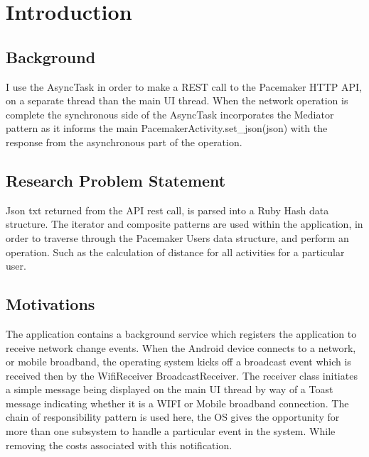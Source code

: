 \documentclass[runningheads,a4paper]{llncs}
\begin{document}
%
%
\section{Introduction}
\subsection{Background}
I use the AsyncTask in order to make a REST call \cite[p.~215]{Xarticle} to the Pacemaker HTTP API, on a separate thread than the main UI thread. When the network operation is complete the synchronous side of the AsyncTask incorporates the Mediator pattern as it informs the main PacemakerActivity.set\_json(json) with the response from the asynchronous part of the operation. \citep*{goossens93}
%
\newpage
%
\subsection{Research Problem Statement}
Json txt returned from the API rest call, is parsed into a Ruby Hash data structure. The iterator and composite patterns are used within the application, in order to traverse through the Pacemaker Users data structure, and perform an operation. Such as the calculation of distance for all activities for a particular user.
%
\newpage
%
\subsection{Motivations}
The application contains a background service which registers the application to receive network change events. When the Android device connects to a network, or mobile broadband, the operating system kicks off a broadcast event which is received then by the WifiReceiver BroadcastReceiver. The receiver class initiates a simple message being displayed on the main UI thread by way of a Toast message indicating whether it is a WIFI or Mobile broadband connection. The chain of responsibility pattern is used here, the OS gives the opportunity for more than one subsystem to handle a particular event in the system. While removing the costs associated with this notification.
%
\newpage
%
\end{document}
